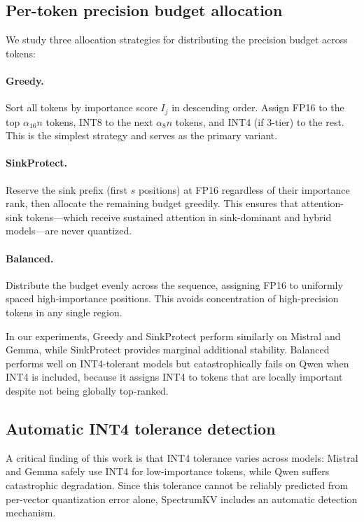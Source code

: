 \documentclass[11pt]{article}
\newcommand{\method}{SpectrumKV}
\theoremstyle{definition}
\theoremstyle{plain}
\begin{document}
\subsection{Per-token precision budget allocation}
\label{sec:budget-alloc}
We study three allocation strategies for distributing the precision budget across tokens:

\paragraph{Greedy.} Sort all tokens by importance score $I_j$ in descending order.  Assign FP16 to the top $\alpha_{16} n$ tokens, INT8 to the next $\alpha_8 n$ tokens, and INT4 (if 3-tier) to the rest.  This is the simplest strategy and serves as the primary variant.

\paragraph{SinkProtect.} Reserve the sink prefix (first $s$ positions) at FP16 regardless of their importance rank, then allocate the remaining budget greedily.  This ensures that attention-sink tokens---which receive sustained attention in sink-dominant and hybrid models---are never quantized.

\paragraph{Balanced.} Distribute the budget evenly across the sequence, assigning FP16 to uniformly spaced high-importance positions.  This avoids concentration of high-precision tokens in any single region.

In our experiments, Greedy and SinkProtect perform similarly on Mistral and Gemma, while SinkProtect provides marginal additional stability.  Balanced performs well on INT4-tolerant models but catastrophically fails on Qwen when INT4 is included, because it assigns INT4 to tokens that are locally important despite not being globally top-ranked.

\subsection{Automatic INT4 tolerance detection}
\label{sec:probe}
A critical finding of this work is that INT4 tolerance varies across models: Mistral and Gemma safely use INT4 for low-importance tokens, while Qwen suffers catastrophic degradation.  Since this tolerance cannot be reliably predicted from per-vector quantization error alone, \method{} includes an automatic detection mechanism.
\end{document}
